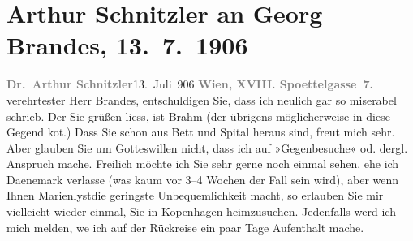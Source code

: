 

         
         \renewcommand{\erwaehntePersonen}{Personen: Otto Brahm, Georg Brandes}
         \renewcommand{\erwaehnteOrte}{Orte: Dänemark, Edmund-Weiß-Gasse, Kopenhagen, Marienlyst, Schweden, Skodsborg}
         \renewcommand{\erwaehnteWerke}{}
               \section[Arthur Schnitzler an Georg Brandes, 13. 7. 1906]{ Arthur Schnitzler an Georg Brandes, 13. 7. 1906}\nopagebreak{}\rehead{ }\begin{ledgroupsized}[t]{13cm}\normalsize\beginnumbering \toendnotes[C]{\smallbreak\pagebreak[2]} 
\pstart
           \noindent{}{\pb}\textcolor{gray}{\textbf{Dr. Arthur Schnitzler}}\hfill 13. Juli 906\pend
           \pstart
           \textcolor{gray}{\textbf{Wien, XVIII. Spoettelgasse 7.}}\pend
           \pstart{}verehrtester Herr Brandes,\pend\pstart
           entschuldigen Sie, dass ich neulich gar so miserabel schrieb. Der Sie grüßen liess,
               ist Brahm (der übrigens möglicherweise in
               diese Gegend ko{\geminationm}t.) Dass Sie schon aus Bett und Spital
               heraus sind, freut mich sehr. Aber glauben Sie um Gotteswillen nicht, dass ich auf
               »Gegenbesuche« od. dergl. Anspruch mache. Freilich möchte ich Sie sehr gerne noch
               einmal sehen, ehe ich Daenemark verlasse (was
               kaum vor 3–4 Wochen der Fall sein wird), aber wenn Ihnen Marienlystdie geringste Unbequemlichkeit macht, so erlauben
               Sie mir vielleicht wieder einmal, Sie in Kopenhagen heimzusuchen. Jedenfalls werd ich mich melden, we{\geminationn} ich auf der Rückreise ein paar Tage Aufenthalt mache.

\end{ledgroupsized}

